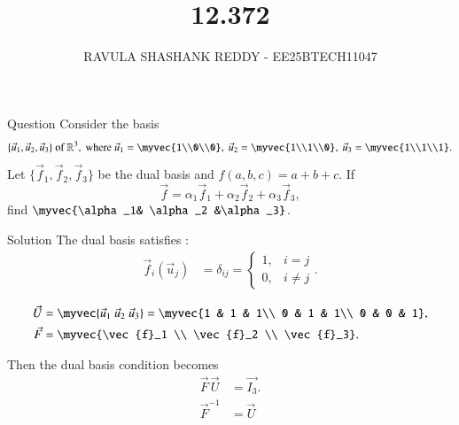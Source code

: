 \documentclass{beamer}
\title %
{12.372}
\author %
{RAVULA SHASHANK REDDY - EE25BTECH11047}
\begin{document}
	
	
	\frame{\titlepage}
	\begin{frame}{Question}
     Consider the basis 
\[
\{\vec{u}_1, \vec{u}_2, \vec{u}_3\} \text{ of } \mathbb{R}^3, \text{ where }
\vec{u}_1 = \myvec{1\\0\\0}, \ 
\vec{u}_2 = \myvec{1\\1\\0}, \
\vec{u}_3 = \myvec{1\\1\\1}.
\]
Let $\{\vec{f}_1, \vec{f}_2, \vec{f}_3\}$ be the dual basis and 
$f(a,b,c) = a+b+c$. If 
\[
\vec{f} = \alpha_1 \vec{f}_1 + \alpha_2 \vec{f}_2 + \alpha_3 \vec{f}_3,
\] 
find $\myvec{\alpha_1& \alpha_2 &\alpha_3}$.
\end{frame}
\begin{frame}{Solution}
    The dual basis satisfies :
\begin{align}
\vec{f}_i(\vec{u}_j) &= \delta_{ij} = 
\begin{cases} 
1, & i=j \\ 
0, & i\neq j 
\end{cases}. \label{eq:delta}
\end{align}

\begin{align}
\vec{U} &= \myvec{\vec{u}_1 \ \vec{u}_2 \ \vec{u}_3} 
= \myvec{1 & 1 & 1\\ 0 & 1 & 1\\ 0 & 0 & 1}, \\
\vec{F} &= \myvec{\vec{f}_1 \\ \vec{f}_2 \\ \vec{f}_3}.
\end{align}

Then the dual basis condition becomes
\begin{align}
\vec{F} \, \vec{U} &= \vec{I_3}. \label{eq:F_U}\\
\vec{F}^{-1} &= \vec{U} 
\end{align}
\end{frame}
\end{document}
